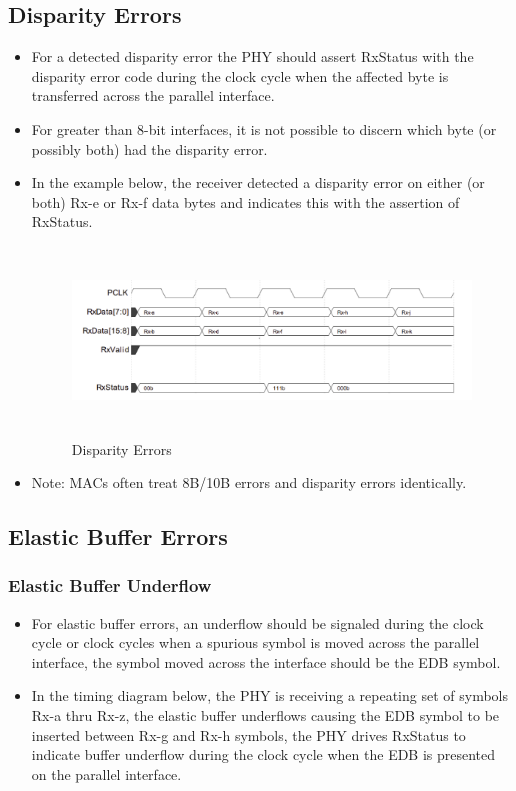 \subsection{Disparity Errors} 
\begin{itemize}
    \item For a detected disparity error the PHY should assert RxStatus with the disparity error code during the clock cycle when the affected byte is transferred across the parallel interface.
 
    \item For greater than 8-bit interfaces, it is not possible to discern which byte (or possibly both) had the disparity error.

    \item In the example below, the receiver detected a disparity error on either (or both) Rx-e or Rx-f data bytes and indicates this with the assertion of RxStatus.

\begin{figure}[H]
  \centering
  \includegraphics[width=130mm,height=50mm]{images/clk_diagram/disparity.png}
  \caption{Disparity Errors}
  \label{lane}
\end{figure}
\item  Note: MACs often treat 8B/10B errors and disparity errors identically.
\end{itemize}


\subsection{Elastic Buffer Errors}
\subsubsection{Elastic Buffer Underflow}

\begin{itemize}
    \item For elastic buffer errors, an underflow should be signaled during the clock cycle or clock cycles when a spurious symbol is moved across the parallel interface, the symbol moved across the interface should be the EDB symbol.

    \item In the timing diagram below, the PHY is receiving a repeating set of symbols Rx-a thru Rx-z, the elastic buffer underflows causing the EDB symbol to be inserted between Rx-g and Rx-h symbols, the PHY drives RxStatus to indicate buffer underflow during the clock cycle when the EDB is presented on the parallel interface.

\end{itemize}




